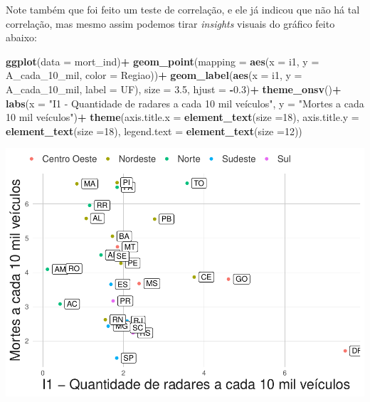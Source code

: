 \documentclass[
]{book}
\newenvironment{Shaded}{\begin{snugshade}}{\end{snugshade}}
\newcommand{\AttributeTok}[1]{\textcolor[rgb]{0.13,0.29,0.53}{#1}}
\newcommand{\DecValTok}[1]{\textcolor[rgb]{0.00,0.00,0.81}{#1}}
\newcommand{\FloatTok}[1]{\textcolor[rgb]{0.00,0.00,0.81}{#1}}
\newcommand{\FunctionTok}[1]{\textcolor[rgb]{0.13,0.29,0.53}{\textbf{#1}}}
\newcommand{\NormalTok}[1]{#1}
\newcommand{\SpecialCharTok}[1]{\textcolor[rgb]{0.81,0.36,0.00}{\textbf{#1}}}
\newcommand{\StringTok}[1]{\textcolor[rgb]{0.31,0.60,0.02}{#1}}
\begin{document}
Note também que foi feito um teste de correlação, e ele já indicou que não há tal correlação, mas mesmo assim podemos tirar \emph{insights} visuais do gráfico feito abaixo:

\begin{Shaded}
\begin{Highlighting}[]
\FunctionTok{ggplot}\NormalTok{(}\AttributeTok{data =}\NormalTok{ mort\_ind)}\SpecialCharTok{+}
  \FunctionTok{geom\_point}\NormalTok{(}\AttributeTok{mapping =} \FunctionTok{aes}\NormalTok{(}\AttributeTok{x =}\NormalTok{ i1, }\AttributeTok{y =}\NormalTok{ A\_cada\_10\_mil, }\AttributeTok{color =}\NormalTok{ Regiao))}\SpecialCharTok{+}
  \FunctionTok{geom\_label}\NormalTok{(}\FunctionTok{aes}\NormalTok{(}\AttributeTok{x =}\NormalTok{ i1, }\AttributeTok{y =}\NormalTok{ A\_cada\_10\_mil, }\AttributeTok{label =}\NormalTok{ UF), }\AttributeTok{size =} \FloatTok{3.5}\NormalTok{, }\AttributeTok{hjust =} \SpecialCharTok{{-}}\FloatTok{0.3}\NormalTok{)}\SpecialCharTok{+}
  \FunctionTok{theme\_onsv}\NormalTok{()}\SpecialCharTok{+}
  \FunctionTok{labs}\NormalTok{(}\AttributeTok{x =} \StringTok{"I1 {-} Quantidade de radares a cada 10 mil veículos"}\NormalTok{, }\AttributeTok{y =} \StringTok{"Mortes a cada 10 mil veículos"}\NormalTok{)}\SpecialCharTok{+}
  \FunctionTok{theme}\NormalTok{(}\AttributeTok{axis.title.x =} \FunctionTok{element\_text}\NormalTok{(}\AttributeTok{size =}\DecValTok{18}\NormalTok{),}
        \AttributeTok{axis.title.y =} \FunctionTok{element\_text}\NormalTok{(}\AttributeTok{size =}\DecValTok{18}\NormalTok{), }
        \AttributeTok{legend.text =} \FunctionTok{element\_text}\NormalTok{(}\AttributeTok{size =}\DecValTok{12}\NormalTok{))}
\end{Highlighting}
\end{Shaded}

\includegraphics{_main_files/figure-latex/unnamed-chunk-28-1.pdf}

  
\end{document}
